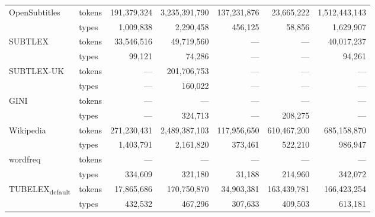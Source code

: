 \begin{tabular}{llrrrrr}
\multirow[c]{2}{*}{OpenSubtitles} & tokens & 191,379,324 & 3,235,391,790 & 137,231,876 & 23,665,222 & 1,512,443,143 \\
 & \cellcolor[HTML]{EEEEEE} types & \cellcolor[HTML]{EEEEEE} 1,009,838 & \cellcolor[HTML]{EEEEEE} 2,290,458 & \cellcolor[HTML]{EEEEEE} 456,125 & \cellcolor[HTML]{EEEEEE} 58,856 & \cellcolor[HTML]{EEEEEE} 1,629,907 \\
\multirow[c]{2}{*}{SUBTLEX} & tokens & 33,546,516 & 49,719,560 & --- & --- & 40,017,237 \\
 & \cellcolor[HTML]{EEEEEE} types & \cellcolor[HTML]{EEEEEE} 99,121 & \cellcolor[HTML]{EEEEEE} 74,286 & \cellcolor[HTML]{EEEEEE} --- & \cellcolor[HTML]{EEEEEE} --- & \cellcolor[HTML]{EEEEEE} 94,261 \\
\multirow[c]{2}{*}{SUBTLEX-UK} & tokens & --- & 201,706,753 & --- & --- & --- \\
 & \cellcolor[HTML]{EEEEEE} types & \cellcolor[HTML]{EEEEEE} --- & \cellcolor[HTML]{EEEEEE} 160,022 & \cellcolor[HTML]{EEEEEE} --- & \cellcolor[HTML]{EEEEEE} --- & \cellcolor[HTML]{EEEEEE} --- \\
\multirow[c]{2}{*}{GINI} & tokens & --- & --- & --- & --- & --- \\
 & \cellcolor[HTML]{EEEEEE} types & \cellcolor[HTML]{EEEEEE} --- & \cellcolor[HTML]{EEEEEE} 324,713 & \cellcolor[HTML]{EEEEEE} --- & \cellcolor[HTML]{EEEEEE} 208,275 & \cellcolor[HTML]{EEEEEE} --- \\
\multirow[c]{2}{*}{Wikipedia} & tokens & 271,230,431 & 2,489,387,103 & 117,956,650 & 610,467,200 & 685,158,870 \\
 & \cellcolor[HTML]{EEEEEE} types & \cellcolor[HTML]{EEEEEE} 1,403,791 & \cellcolor[HTML]{EEEEEE} 2,161,820 & \cellcolor[HTML]{EEEEEE} 373,461 & \cellcolor[HTML]{EEEEEE} 522,210 & \cellcolor[HTML]{EEEEEE} 986,947 \\
\multirow[c]{2}{*}{wordfreq} & tokens & --- & --- & --- & --- & --- \\
 & \cellcolor[HTML]{EEEEEE} types & \cellcolor[HTML]{EEEEEE} 334,609 & \cellcolor[HTML]{EEEEEE} 321,180 & \cellcolor[HTML]{EEEEEE} 31,188 & \cellcolor[HTML]{EEEEEE} 214,960 & \cellcolor[HTML]{EEEEEE} 342,072 \\
\multirow[c]{2}{*}{TUBELEX\textsubscript{default}} & tokens & 17,865,686 & 170,750,870 & 34,903,381 & 163,439,781 & 166,423,254 \\
 & \cellcolor[HTML]{EEEEEE} types & \cellcolor[HTML]{EEEEEE} 432,532 & \cellcolor[HTML]{EEEEEE} 467,296 & \cellcolor[HTML]{EEEEEE} 307,633 & \cellcolor[HTML]{EEEEEE} 409,503 & \cellcolor[HTML]{EEEEEE} 613,181 \\
\bottomrule
\end{tabular}
